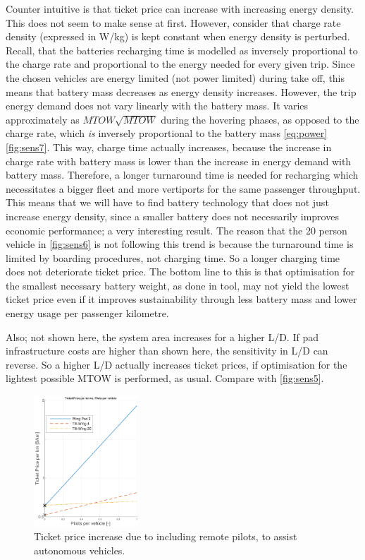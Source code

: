 Counter intuitive is that ticket price can increase with increasing energy density. This does not seem to make sense at first. However, consider that charge rate density (expressed in W/kg) is kept constant when energy density is perturbed. Recall, that the batteries recharging time is modelled as inversely proportional to the charge rate and proportional to the energy needed for every given trip. Since the chosen vehicles are energy limited (not power limited) during take off, this means that battery mass decreases as energy density increases. However, the trip energy demand does not vary linearly with the battery mass. It varies approximately as $MTOW\sqrt{MTOW}$ during the hovering phases, as opposed to the charge rate, which \emph{is} inversely proportional to the battery mass \autoref{eq:power}\autoref{fig:sens7}. This way, charge time actually increases, because the increase in charge rate with battery mass is lower than the increase in energy demand with battery mass. Therefore, a longer turnaround time is needed for recharging which necessitates a bigger fleet and more vertiports for the same passenger throughput. This means that we will have to find battery technology that does not just increase energy density, since a smaller battery does not necessarily improves economic performance; a very interesting result. The reason that the 20 person vehicle in \autoref{fig:sens6} is not following this trend is because the turnaround time is limited by boarding procedures, not charging time. So a longer charging time does not deteriorate ticket price. The bottom line to this is that optimisation for the smallest necessary battery weight, as done in tool, may not yield the lowest ticket price even if it improves sustainability through less battery mass and lower energy usage per passenger kilometre.

Also; not shown here, the system area increases for a higher L/D. If pad infrastructure costs are higher than shown here, the sensitivity in L/D can reverse. So a higher L/D actually increases ticket prices, if optimisation for the lightest possible MTOW is performed, as usual. Compare with \autoref{fig:sens5}.


\begin{figure}
    \centering
    \includegraphics[width=0.35\textwidth]{Figures/autonomous_TPrice_perkm.png}
    \captionsetup{justification=centering}
    \caption{Ticket price increase due to including remote pilots, to assist autonomous vehicles.}
    \label{fig:autocost}
\end{figure}

